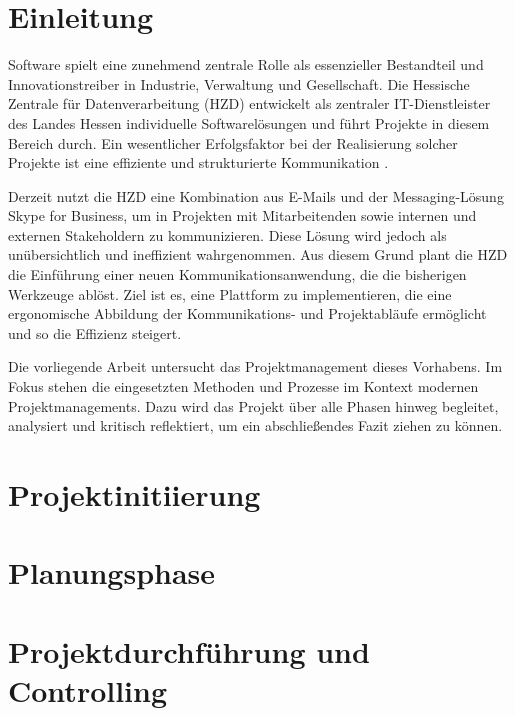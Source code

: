 \documentclass[12pt,oneside]{article}
\begin{document}
\cleardoublepage
{}
    \setcounter{page}{1}
\lhead{\nouppercase{\leftmark}}

\section{Einleitung}
Software spielt eine zunehmend zentrale Rolle als essenzieller Bestandteil und Innovationstreiber in Industrie, Verwaltung und Gesellschaft. Die Hessische Zentrale für Datenverarbeitung (HZD) entwickelt als zentraler IT-Dienstleister des Landes Hessen individuelle Softwarelösungen und führt Projekte in diesem Bereich durch. Ein wesentlicher Erfolgsfaktor bei der Realisierung solcher Projekte ist eine effiziente und strukturierte Kommunikation \cite{pikkarainen_impact_2008}. 

Derzeit nutzt die HZD eine Kombination aus E-Mails und der Messaging-Lösung Skype for Business, um in Projekten mit Mitarbeitenden sowie internen und externen Stakeholdern zu kommunizieren. Diese Lösung wird jedoch als unübersichtlich und ineffizient wahrgenommen. Aus diesem Grund plant die HZD die Einführung einer neuen Kommunikationsanwendung, die die bisherigen Werkzeuge ablöst. Ziel ist es, eine Plattform zu implementieren, die eine ergonomische Abbildung der Kommunikations- und Projektabläufe ermöglicht und so die Effizienz steigert.

Die vorliegende Arbeit untersucht das Projektmanagement dieses Vorhabens. Im Fokus stehen die eingesetzten Methoden und Prozesse im Kontext modernen Projektmanagements. Dazu wird das Projekt über alle Phasen hinweg begleitet, analysiert und kritisch reflektiert, um ein abschließendes Fazit ziehen zu können.


\section{Projektinitiierung}


\section{Planungsphase}


\section{Projektdurchführung und Controlling}

\end{document}
